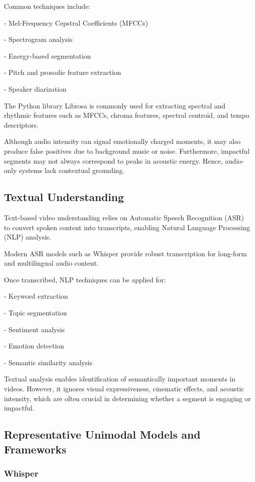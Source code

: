 \documentclass[12pt,a4paper,oneside,english]{book}
\begin{document}
Common techniques include:

- Mel-Frequency Cepstral Coefficients (MFCCs)

- Spectrogram analysis

- Energy-based segmentation

- Pitch and prosodic feature extraction

- Speaker diarization

The Python library Librosa is commonly used for extracting spectral and rhythmic features such as MFCCs, chroma features, spectral centroid, and tempo descriptors.

Although audio intensity can signal emotionally charged moments, it may also produce false positives due to background music or noise. Furthermore, impactful segments may not always correspond to peaks in acoustic energy. Hence, audio-only systems lack contextual grounding.

\subsection{Textual Understanding}
\label{subsec:textual}
Text-based video understanding relies on Automatic Speech Recognition (ASR) to convert spoken content into transcripts, enabling Natural Language Processing (NLP) analysis.

Modern ASR models such as Whisper provide robust transcription for long-form and multilingual audio content.

Once transcribed, NLP techniques can be applied for:

- Keyword extraction

- Topic segmentation

- Sentiment analysis

- Emotion detection

- Semantic similarity analysis

Textual analysis enables identification of semantically important moments in videos. However, it ignores visual expressiveness, cinematic effects, and acoustic intensity, which are often crucial in determining whether a segment is engaging or impactful.
\subsection{Representative Unimodal Models and Frameworks}
\label{subsec:unimodal_models}


\subsubsection{Whisper}
\label{subsubsec:whisper}
\end{document}
